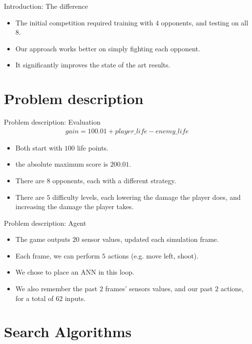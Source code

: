 \documentclass[boxes]{beamer}
\begin{document}
\begin{frame}{Introduction: The difference}
  \begin{itemize}
  \item The initial competition required training with $4$ opponents, and testing on all $8$.
  \item Our approach works better on simply fighting each opponent.
  \item It significantly improves the state of the art results.
  \end{itemize}
\end{frame}

\section{Problem description}
\begin{frame}{Problem description: Evaluation}
  \begin{gather*}
    gain = 100.01 + player\_life - enemy\_life
  \end{gather*}
  \begin{itemize}
  \item Both start with $100$ life points.
  \item the absolute maximum score is $200.01$.
  \item There are $8$ opponents, each with a different strategy.
  \item There are $5$ difficulty levels, each lowering the damage the player does, and increasing the damage the player takes.
  \end{itemize}
\end{frame}

\begin{frame}{Problem description: Agent}
  \begin{itemize}
  \item The game outputs $20$ sensor values, updated each simulation frame.
  \item Each frame, we can perform $5$ actions (e.g. move left, shoot).
    \pause
  \item We chose to place an ANN in this loop.
    \pause
    \item We also remember the past $2$ frames' sensors values, and our past $2$ actions, for a total of $62$ inputs.
  \end{itemize}
\end{frame}

\section{Search Algorithms}
\end{document}
